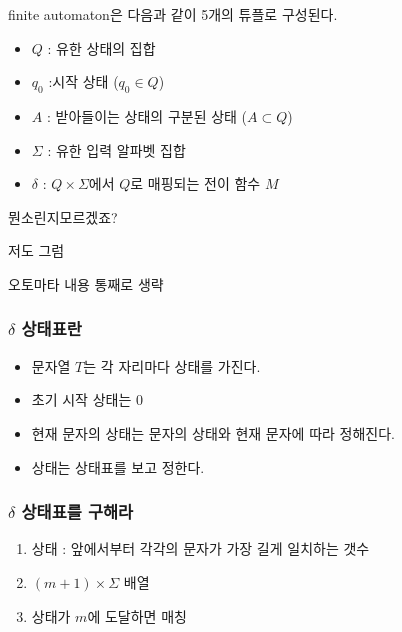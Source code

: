 \documentclass[10pt]{beamer}
\begin{document}
\begin{frame}
\begin{dfn}[automata]
    finite automaton은 다음과 같이 5개의 튜플로 구성된다.
    \begin{itemize}
        \item $Q$ : 유한 상태의 집합
        \item $q_0$ :시작 상태 ($q_0 \in Q$)
        \item $A$ : 받아들이는 상태의 구분된 상태 ($A \subset Q$)
        \item $\Sigma$ : 유한 입력 알파벳 집합
        \item $\delta$ : $Q \times \Sigma$에서 $Q$로 매핑되는 전이 함수 $M$    \end{itemize}
\end{dfn}
\end{frame}



\begin{frame}
        
    뭔소린지모르겠죠?

    저도 그럼

    오토마타 내용 통째로 생략

\end{frame}


\begin{frame}
    \frametitle{$\delta$ 상태표란}
    \begin{itemize}
        \item 문자열 $T$는 각 자리마다 상태를 가진다.
        \item 초기 시작 상태는 0
        \item 현재 문자의 상태는 문자의 상태와 현재 문자에 따라 정해진다.
        \item 상태는 상태표를 보고 정한다.
    \end{itemize}
\end{frame}


\begin{frame}
    \frametitle{$\delta$ 상태표를 구해라}
    \begin{enumerate}
        \item 상태 : 앞에서부터 각각의 문자가 가장 길게 일치하는 갯수
        \item $(m+1) \times \Sigma$ 배열
        \item 상태가 $m$에 도달하면 매칭
    \end{enumerate}
\end{frame}
\end{document}
